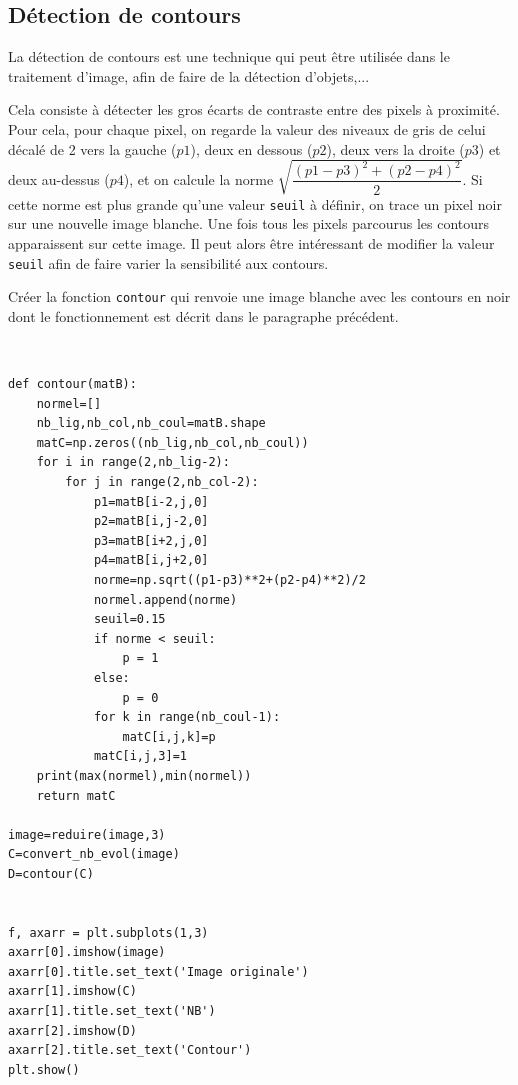 \subsection{Détection de contours}

La détection de contours est une technique qui peut être utilisée dans le traitement d'image, afin de faire de la détection d'objets,...

Cela consiste à détecter les gros écarts de contraste entre des pixels à proximité. Pour cela, pour chaque pixel, on regarde la valeur des niveaux de gris de celui décalé de 2 vers la gauche ($p1$), deux en dessous ($p2$), deux vers la droite ($p3$) et deux au-dessus ($p4$), et on calcule la norme $\sqrt{\dfrac{(p1-p3)^2+(p2-p4)^2}{2}}$. Si cette norme est plus grande qu'une valeur \verb?seuil? à définir, on trace un pixel noir sur une nouvelle image blanche. Une fois tous les pixels parcourus les contours apparaissent sur cette image. Il peut alors être intéressant de modifier la valeur \verb?seuil? afin de faire varier la sensibilité aux contours.

\begin{exercice}
Créer la fonction \verb?contour? qui renvoie une image blanche avec les contours en noir dont le fonctionnement est décrit dans le paragraphe précédent.
\end{exercice}

\begin{solution}~\\
\vspace{-0.7cm}
\begin{verbatim}
def contour(matB):
    normel=[]
    nb_lig,nb_col,nb_coul=matB.shape
    matC=np.zeros((nb_lig,nb_col,nb_coul))
    for i in range(2,nb_lig-2):
        for j in range(2,nb_col-2):
            p1=matB[i-2,j,0]
            p2=matB[i,j-2,0]            
            p3=matB[i+2,j,0]            
            p4=matB[i,j+2,0]
            norme=np.sqrt((p1-p3)**2+(p2-p4)**2)/2
            normel.append(norme)
            seuil=0.15
            if norme < seuil:
                p = 1
            else:
                p = 0               
            for k in range(nb_coul-1):
                matC[i,j,k]=p
            matC[i,j,3]=1
    print(max(normel),min(normel))
    return matC

image=reduire(image,3)
C=convert_nb_evol(image)
D=contour(C)


f, axarr = plt.subplots(1,3)
axarr[0].imshow(image)
axarr[0].title.set_text('Image originale')
axarr[1].imshow(C)
axarr[1].title.set_text('NB')
axarr[2].imshow(D)
axarr[2].title.set_text('Contour')
plt.show()
\end{verbatim} 
\end{solution}




















